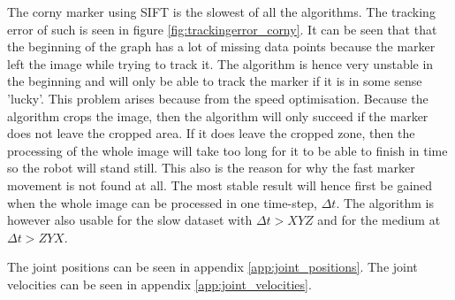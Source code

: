 The corny marker using SIFT is the slowest of all the algorithms.
The tracking error of such is seen in figure \ref{fig:trackingerror_corny}.
It can be seen that that the beginning of the graph has a lot of missing data points because the marker left the image while trying to track it.
The algorithm is hence very unstable in the beginning and will only be able to track the marker if it is in some sense 'lucky'.
This problem arises because from the speed optimisation.
Because the algorithm crops the image, then the algorithm will only succeed if the marker does not leave the cropped area.
If it does leave the cropped zone, then the processing of the whole image will take too long for it to be able to finish in time so the robot will stand still.
This also is the reason for why the fast marker movement is not found at all.
The most stable result will hence first be gained when the whole image can be processed in one time-step, $\Delta t$.
The algorithm is however also usable for the slow dataset with $\Delta t > XYZ$ and for the medium at $\Delta t > ZYX$.





The joint positions can be seen in appendix \ref{app:joint_positions}.
The joint velocities can be seen in appendix \ref{app:joint_velocities}.